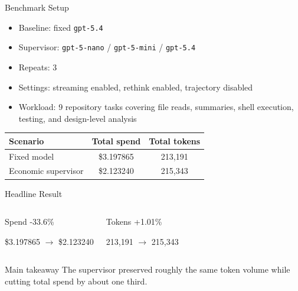\documentclass[aspectratio=169]{beamer}
\begin{document}
\begin{frame}{Benchmark Setup}
  \begin{itemize}
    \item Baseline: fixed \texttt{gpt-5.4}
    \item Supervisor: \texttt{gpt-5-nano} / \texttt{gpt-5-mini} / \texttt{gpt-5.4}
    \item Repeats: 3
    \item Settings: streaming enabled, rethink enabled, trajectory disabled
    \item Workload: 9 repository tasks covering file reads, summaries, shell execution, testing, and design-level analysis
  \end{itemize}

  \vspace{0.5em}

  \begin{table}
    \centering
    \begin{tabular}{lcc}
      \toprule
      Scenario & Total spend & Total tokens \\
      \midrule
      Fixed model & \$3.197865 & 213{,}191 \\
      Economic supervisor & \$2.123240 & 215{,}343 \\
      \bottomrule
    \end{tabular}
  \end{table}
\end{frame}

\begin{frame}{Headline Result}
  \begin{columns}[T]
    \begin{block}{Spend}
      \centering
      {\LARGE -33.6\%}

      \vspace{0.3em}
      \$3.197865 $\rightarrow$ \$2.123240
    \end{block}

    \begin{block}{Tokens}
      \centering
      {\LARGE +1.01\%}

      \vspace{0.3em}
      213{,}191 $\rightarrow$ 215{,}343
    \end{block}
  \end{columns}

  \vspace{0.8em}

  \begin{alertblock}{Main takeaway}
    The supervisor preserved roughly the same token volume while cutting total spend by about one third.
  \end{alertblock}
\end{frame}
\end{document}
